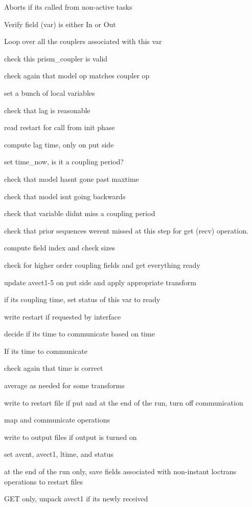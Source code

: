 \begin{DoxyItemize}
\item Aborts if it\textquotesingle{}s called from non-\/active tasks
\item Verify field (var) is either In or Out
\item Loop over all the couplers associated with this var
\begin{DoxyItemize}
\item check this prism\+\_\+coupler is valid
\item check again that model op matches coupler op
\item set a bunch of local variables
\item check that lag is reasonable
\item read restart for call from init phase
\item compute lag time, only on put side
\item set time\+\_\+now, is it a coupling period?
\item check that model hasn\textquotesingle{}t gone past maxtime
\item check that model isn\textquotesingle{}t going backwards
\item check that variable didn\textquotesingle{}t miss a coupling period
\item check that prior sequences weren\textquotesingle{}t missed at this step for get (recv) operation.
\item compute field index and check sizes
\item check for higher order coupling fields and get everything ready
\item update avect1-\/5 on put side and apply appropriate transform
\item if its coupling time, set status of this var to ready
\item write restart if requested by interface
\item decide if it\textquotesingle{}s time to communicate based on time
\item If it\textquotesingle{}s time to communicate
\begin{DoxyItemize}
\item check again that time is correct
\item average as needed for some transforms
\item write to restart file if put and at the end of the run, turn off communication
\item map and communicate operations
\item write to output files if output is turned on
\item set avcnt, avect1, ltime, and status
\end{DoxyItemize}
\item at the end of the run only, save fields associated with non-\/instant loctrans operations to restart files
\item G\+ET only, unpack avect1 if it\textquotesingle{}s newly received 
\end{DoxyItemize}
\end{DoxyItemize}

